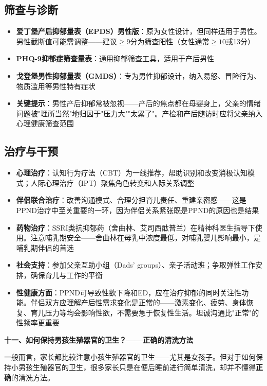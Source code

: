 \documentclass[12pt,a4paper,twoside]{ctexbook}
\begin{document}
\subsection{筛查与诊断}

\begin{itemize}[leftmargin=2cm]
	\item \textbf{爱丁堡产后抑郁量表（EPDS）男性版}：原为女性设计，但同样适用于男性。男性截断值可能需调整——建议$\geq 9$分为筛查阳性（女性通常$\geq 10$或13分）
	\item \textbf{PHQ-9抑郁症筛查量表}：通用抑郁筛查工具，适用于产后男性
	\item \textbf{戈登堡男性抑郁量表（GMDS）}：专为男性抑郁设计，纳入易怒、冒险行为、物质滥用等男性特有症状
	\item \textbf{关键提示}：男性产后抑郁常被忽视——产后的焦点都在母婴身上，父亲的情绪问题被"理所当然"地归因于"压力大""太累了"。产检和产后随访时应将父亲纳入心理健康筛查范围
\end{itemize}

\subsection{治疗与干预}

\begin{itemize}[leftmargin=2cm]
	\item \textbf{心理治疗}：认知行为疗法（CBT）为一线推荐，帮助识别和改变消极认知模式；人际心理治疗（IPT）聚焦角色转变和人际关系调整
	\item \textbf{伴侣联合治疗}：改善沟通模式、合理分担育儿责任、重建亲密感——这是PPND治疗中至关重要的一环，因为伴侣关系紧张既是PPND的原因也是结果
	\item \textbf{药物治疗}：SSRI类抗抑郁药（舍曲林、艾司西酞普兰）在精神科医生指导下使用。注意哺乳期安全——舍曲林在母乳中浓度最低，对哺乳婴儿影响最小，是哺乳期伴侣的首选
	\item \textbf{社会支持}：参加父亲互助小组（Dads' groups）、亲子活动班；争取弹性工作安排，确保育儿与工作的平衡
	\item \textbf{性健康方面}：PPND可导致性欲下降和ED，应在治疗抑郁的同时关注性功能。伴侣双方应理解产后性需求变化是正常的——激素变化、疲劳、身体恢复、育儿压力等均会影响性欲，不需要急于恢复性生活。坦诚沟通比"正常"的性频率更重要
\end{itemize}

\vspace{0.8em}
\noindent\textbf{十一、如何保持男孩生殖器官的卫生？——正确的清洗方法}

一般而言，家长都比较注意小孩生殖器官的卫生——尤其是女孩子。但对于如何保持小男孩生殖器官的卫生，很多家长只是在便后睡前进行简单清洗，却并不懂得\textbf{正确}的清洗方法。
\end{document}
